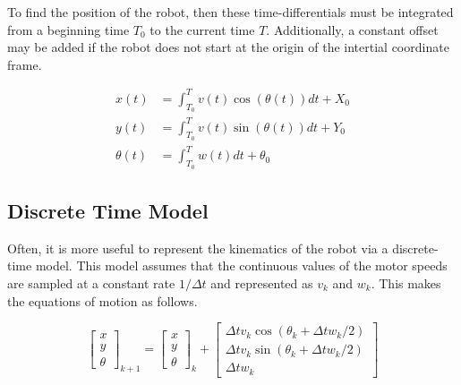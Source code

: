 \documentclass[10pt]{amsart}
\begin{document}
To find the position of the robot, then these time-differentials must be integrated from a beginning time $T_{0}$ to the current time $T$.  Additionally, a constant offset may be added if the robot does not start
at the origin of the intertial coordinate frame.

\begin{equation}
\begin{align}
 x(t) &= \int_{T_{0}}^{T} v(t) \cos{(\theta(t))} dt + X_{0} \\
 y(t) &= \int_{T_{0}}^{T} v(t) \sin{(\theta(t))} dt + Y_{0} \\
 \theta(t) &= \int_{T_{0}}^{T} w(t) dt + \theta_{0}
\end{align}
\end{equation}

\subsection{Discrete Time Model}
Often, it is more useful to represent the kinematics of the robot via a discrete-time model.  This model assumes that the continuous values of the motor speeds are sampled at a 
constant rate $1/\Delta t$ and represented as $v_k$ and $w_k$.  This makes the equations of motion as follows.

\begin{equation}
 \begin{bmatrix}
  x \\ y \\ \theta
 \end{bmatrix}_{k+1} = 
 \begin{bmatrix}
  x \\ y \\ \theta
 \end{bmatrix}_{k} + 
 \begin{bmatrix}
  \Delta t v_k \cos{(\theta_k + \Delta t w_k/2)}\\
  \Delta t v_k \sin{(\theta_k + \Delta t w_k/2)}\\
  \Delta t w_k
 \end{bmatrix}
\end{equation}
\end{document}
